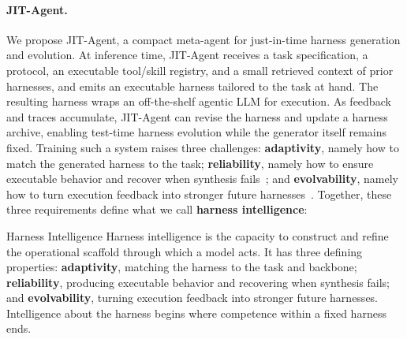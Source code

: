\documentclass{article}
\newcommand{\ourmethod}{JIT-Agent\xspace}
\begin{document}
\paragraph{JIT-Agent.} We propose \ourmethod, a compact meta-agent for just-in-time harness generation and evolution.
At inference time, \ourmethod{} receives a task specification, a protocol, an executable tool/skill registry, and a small retrieved context of prior harnesses, and emits an executable harness tailored to the task at hand.
The resulting harness wraps an off-the-shelf agentic LLM for execution. As feedback and traces accumulate, \ourmethod{} can revise the harness and update a harness archive, enabling test-time harness evolution while the generator itself remains fixed.
Training such a system raises three challenges:
 \textbf{adaptivity}, namely how to match the generated harness to the task;
 \textbf{reliability}, namely how to ensure executable behavior and recover when synthesis fails~\citep{pan2026natural,ning2026code}; and
 \textbf{evolvability}, namely how to turn execution feedback into stronger future harnesses~\citep{lee2026metaharnessendtoendoptimizationmodel,lin2026agenticharnessengineeringobservabilitydriven}.
Together, these three requirements define what we call \textbf{harness intelligence}:

\begin{insightbox}{Harness Intelligence}
Harness intelligence is the capacity to construct and refine the operational scaffold through which a model acts. It has three defining properties: \textbf{adaptivity}, matching the harness to the task and backbone; \textbf{reliability}, producing executable behavior and recovering when synthesis fails; and \textbf{evolvability}, turning execution feedback into stronger future harnesses. Intelligence about the harness begins where competence within a fixed harness ends.
\end{insightbox}
\end{document}
